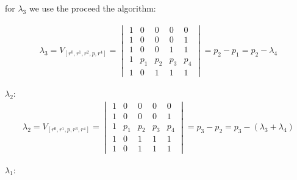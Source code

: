 		for $\lambda_3$ we use the proceed the algorithm:
		
		\begin{equation}
		\begin{align*}
			\lambda_3 =	V_{[r^0,r^1,r^2,p,r^4]} = 
			\begin{vmatrix}
				1 & 0 & 0 & 0 & 0\\ 
				1 & 0 & 0 & 0 & 1\\ 
				1 &  0  & 0 & 1 & 1 \\ 
				1 & p_{1} &  p_{2}& p_{3} & p_{4}\\
				1 & 0 & 1 & 1 & 1
				\end{vmatrix} = p_2 - p_1 = p_2 - \lambda_4
		\end{align*}
		\end{equation}
		
		
		$\lambda_2$:\\
		
		\begin{equation}
		\begin{align*}
			\lambda_2 =	V_{[r^0,r^1,p,r^3,r^4]} = 
			\begin{vmatrix}
				1 & 0 & 0 & 0 & 0\\ 
				1 & 0 & 0 & 0 & 1\\ 
				1 & p_{1} &  p_{2}& p_{3} & p_{4}\\
				1 &  0  & 1 & 1 & 1 \\ 
				1 & 0 & 1 & 1 & 1
				\end{vmatrix} = p_3 - p_2 = p_3 - (\lambda_3 + \lambda_4)
		\end{align*}				
		\end{equation}	
		
		
		$\lambda_1$:\\
				
